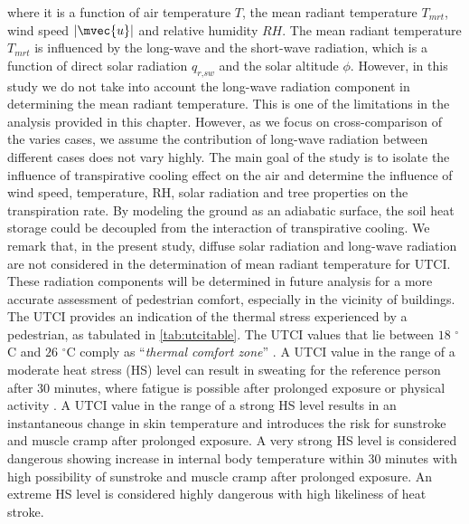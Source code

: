 where it is a function of air temperature $T$, the mean radiant temperature $T_{\textit{mrt}}$, wind speed $|\mvec{u}|$ and relative humidity $RH$. The mean radiant temperature $T_{\textit{mrt}}$ is influenced by the long-wave and the short-wave radiation, which is a function of direct solar radiation $q_{\textit{r,sw}}$ and the solar altitude $\phi$. However, in this study we do not take into account the long-wave radiation component in determining the mean radiant temperature. This is one of the limitations in the analysis provided in this chapter. However, as we focus on cross-comparison of the varies cases, we assume the contribution of long-wave radiation between different cases does not vary highly. The main goal of the study is to isolate the influence of transpirative cooling effect on the air and determine the influence of wind speed, temperature, RH, solar radiation and tree properties on the transpiration rate. By modeling the ground as an adiabatic surface, the soil heat storage could be decoupled from the interaction of transpirative cooling. We remark that, in the present study, diffuse solar radiation and long-wave radiation are not considered in the determination of mean radiant temperature for UTCI. These radiation components will be determined in future analysis for a more accurate assessment of pedestrian comfort, especially in the vicinity of buildings. The UTCI provides an indication of the thermal stress experienced by a pedestrian, as tabulated in \cref{tab:utcitable}. The UTCI values that lie between $18$ $^{\circ}$C and $26$ $^{\circ}$C comply as “\textit{thermal comfort zone}” \citep{Marshall1987}. A UTCI value in the range of a moderate heat stress (HS) level can result in sweating for the reference person after 30 minutes, where fatigue is possible after prolonged exposure or physical activity \citep{Blazejczyk2012,Bazejczyk2013}. A UTCI value in the range of a strong HS level results in an instantaneous change in skin temperature and introduces the risk for sunstroke and muscle cramp after prolonged exposure. A very strong HS level is considered dangerous showing increase in internal body temperature within 30 minutes with high possibility of sunstroke and muscle cramp after prolonged exposure. An extreme HS level is considered highly dangerous with high likeliness of heat stroke.

